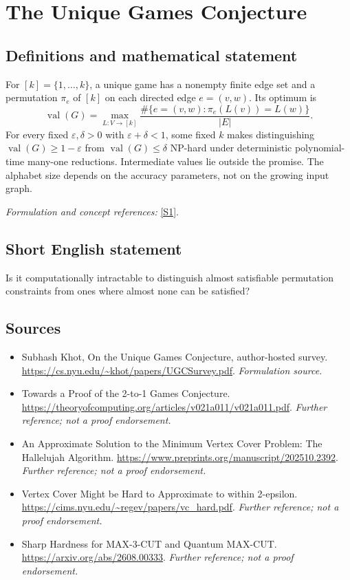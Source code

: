 \documentclass[11pt]{article}
\begin{document}
\section*{\texorpdfstring{The Unique Games Conjecture}{The Unique Games Conjecture}}\label{43}
\subsection{Definitions and mathematical statement}
For $[k]=\{1,\ldots,k\}$, a unique game has a nonempty finite edge set and a permutation $\pi_e$ of $[k]$ on each directed edge $e=(v,w)$. Its optimum is
\[
 \operatorname{val}(G)=\max_{L:V\to[k]}\frac{\#\{e=(v,w):\pi_e(L(v))=L(w)\}}{|E|}.
\]
For every fixed $\varepsilon,\delta>0$ with $\varepsilon+\delta<1$, some fixed $k$ makes distinguishing $\operatorname{val}(G)\ge1-\varepsilon$ from $\operatorname{val}(G)\le\delta$ NP-hard under deterministic polynomial-time many-one reductions. Intermediate values lie outside the promise. The alphabet size depends on the accuracy parameters, not on the growing input graph.
\par\smallskip\textit{Formulation and concept references:} \href{https://cs.nyu.edu/~khot/papers/UGCSurvey.pdf}{[S1]}.

\subsection{Short English statement}
Is it computationally intractable to distinguish almost satisfiable permutation constraints from ones where almost none can be satisfied?
\subsection{Sources}
\begin{itemize}
\item[S1]Subhash Khot, On the Unique Games Conjecture, author-hosted survey.
\url{https://cs.nyu.edu/~khot/papers/UGCSurvey.pdf}.
\textit{Formulation source.}
\item[S2]Towards a Proof of the 2-to-1 Games Conjecture.
\url{https://theoryofcomputing.org/articles/v021a011/v021a011.pdf}.
\textit{Further reference; not a proof endorsement.}
\item[S3]An Approximate Solution to the Minimum Vertex Cover Problem: The Hallelujah Algorithm.
\url{https://www.preprints.org/manuscript/202510.2392}.
\textit{Further reference; not a proof endorsement.}
\item[S4]Vertex Cover Might be Hard to Approximate to within 2-epsilon.
\url{https://cims.nyu.edu/~regev/papers/vc_hard.pdf}.
\textit{Further reference; not a proof endorsement.}
\item[S5]Sharp Hardness for MAX-3-CUT and Quantum MAX-CUT.
\url{https://arxiv.org/abs/2608.00333}.
\textit{Further reference; not a proof endorsement.}
\end{itemize}
\end{document}
